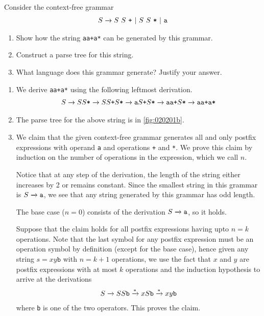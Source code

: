 \begin{exercise}\label{ex:020201}
    Consider the context-free grammar
    \begin{align*}
        {S} \xrightarrow{} S\ S\ \texttt{+}\ |\ S\ S\ \texttt{*}\ |\ \texttt{a}
    \end{align*}
    \begin{enumerate}[label=\alph*)]
        \item Show how the string \texttt{aa+a*} can be generated by this grammar.
        \item Construct a parse tree for this string.
        \item What language does this grammar generate? Justify your answer.
    \end{enumerate}
\end{exercise}
\begin{solution}\label{sol:020201}
    \begin{enumerate}[label=\alph*)]
        \item We derive \texttt{aa+a*} using the following leftmost derivation.
        \begin{align*}
            S \xrightarrow{} SS\texttt{*} 
            \xrightarrow{} SS\texttt{+}S\texttt{*}
            \xrightarrow{} \texttt{a}S\texttt{+}S\texttt{*}
            \xrightarrow{} \texttt{aa+}S\texttt{*}
            \xrightarrow{} \texttt{aa+a*}
        \end{align*}
        \item The parse tree for the above string is in \autoref{fig:020201b}.
        

        \item We claim that the given context-free grammar generates all and only 
        postfix expressions with operand \texttt{a} and operations \texttt{+} and 
        \texttt{*}. We prove this claim by induction on the number of operations
        in the expression, which we call $n$.
        
        \noindent Notice that at any step of the derivation, the length of the string 
        either increases by 2 or remains constant. Since the smallest string in this
        grammar is $S \xrightarrow{} \texttt{a}$, we see that any string generated by this 
        grammar has odd length.

        \noindent The base case ($n = 0$) consists of the derivation $S \xrightarrow{} 
        \texttt{a}$, so it holds.

        \noindent Suppose that the claim holds for all postfix expressions having 
        upto $n = k$ operations. Note that the last symbol for any postfix expression 
        must be an operation symbol by definition (except for the base case), 
        hence given any string $s = xy\texttt{b}$ with $n = k + 1$ operations, 
        we use the fact that $x$ and $y$ are postfix expressions with at most 
        $k$ operations and the induction hypothesis to arrive at the derivations
        \begin{align*}
            S \xrightarrow{} SS\texttt{b} 
            \xrightarrow{*} xS\texttt{b} 
            \xrightarrow{*} xy\texttt{b}
        \end{align*}
        where \texttt{b} is one of the two operators. This proves the claim.
    \end{enumerate}
\end{solution}